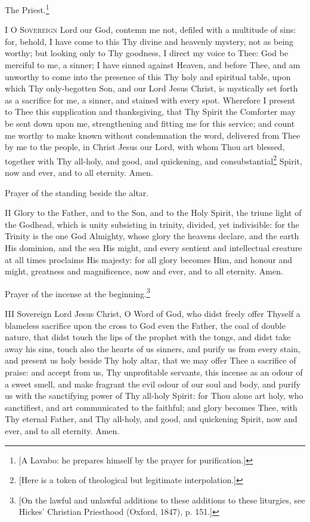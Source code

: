 
The Priest.\footnote{\par{}  [A Lavabo: he prepares himself by the prayer for purification.]}

\textsc{I} O \textsc{Sovereign} Lord our God, contemn me not, defiled with a multitude of sins: for, behold, I have come to this Thy divine and heavenly mystery, not as being worthy; but looking only to Thy goodness, I direct my voice to Thee: God be merciful to me, a sinner; I have sinned against Heaven, and before Thee, and am unworthy to come into the presence of this Thy holy and spiritual table, upon which Thy only-begotten Son, and our Lord Jesus Christ, is mystically set forth as a sacrifice for me, a sinner, and stained with every spot. Wherefore I present to Thee this supplication and thanksgiving, that Thy Spirit the Comforter may be sent down upon me, strengthening and fitting me for this service; and count me worthy to make known without condemnation the word, delivered from Thee by me to the people, in Christ Jesus our Lord, with whom Thou art blessed, together with Thy all-holy, and good, and quickening, and consubstantial\footnote{\par{}  [Here is a token of theological but legitimate interpolation.]} Spirit, now and ever, and to all eternity. Amen.

Prayer of the standing beside the altar.

\textsc{II} Glory to the Father, and to the Son, and to the Holy Spirit, the triune light of the Godhead, which is unity subsisting in trinity, divided, yet indivisible: for the Trinity is the one God Almighty, whose glory the heavens declare, and the earth His dominion, and the sea His might, and every sentient and intellectual creature at all times proclaims His majesty: for all glory becomes Him, and honour and might, greatness and magnificence, now and ever, and to all eternity. Amen.

Prayer of the incense at the beginning.\footnote{\par{}  [On the lawful and unlawful additions to these additions to these liturgies, see Hickes' Christian Priesthood (Oxford, 1847), p. 151.]}

\textsc{III} Sovereign Lord Jesus Christ, O Word of God, who didst freely offer Thyself a blameless sacrifice upon the cross to God even the Father, the coal of double nature, that didst touch the lips of the prophet with the tongs, and didst take away his sins, touch also the hearts of us sinners, and purify us from every stain, and present us holy beside Thy holy altar, that we may offer Thee a sacrifice of praise: and accept from us, Thy unprofitable servants, this incense as an odour of a sweet smell, and make fragrant the evil odour of our soul and body, and purify us with the sanctifying power of Thy all-holy Spirit: for Thou alone art holy, who sanctifiest, and art communicated to the faithful; and glory becomes Thee, with Thy eternal Father, and Thy all-holy, and good, and quickening Spirit, now and ever, and to all eternity. Amen.

